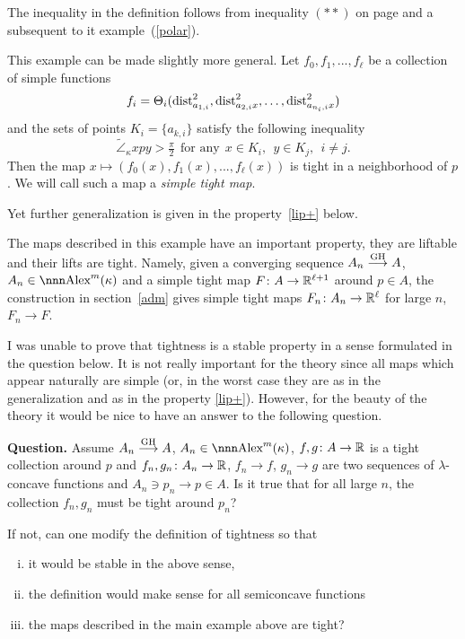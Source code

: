 \documentclass{article}
\begin{document}
The inequality in the definition follows from inequality $(**)$ 
on page \pageref{**-polar-inq} and a subsequent to it example~(\ref{polar}).

This example can be made slightly more general.
Let $f_0,f_1,...,f_\ell$ be a collection of simple functions
$$f_i=\Theta_i(\operatorname{dist}_{a_{1,i}}^2,\operatorname{dist}_{a_{2,i}x}^2,\dots, \operatorname{dist}_{a_{n_i,i}x}^2)$$
and the sets of points $K_i=\{a_{k,i}\}$ satisfy the following inequality
$$\tilde\angle_\kappa x p y>\tfrac\pi2\ \ \text{for any}\ \  x\in K_i,\ \  y\in K_j,\ \ i\not=j.$$
Then the map
$x\mapsto(f_0(x),f_1(x),...,f_\ell(x))$
is tight in a neighborhood of $p$.
 We will call such a map a \emph{simple tight map}.

Yet further generalization is given in the property~\ref{lip+} below.

The maps described in this example have an important property, they are liftable
and their lifts are tight. 
Namely, given a converging sequence $A_n\GHto A$, $A_n\in\Alex^m(\kappa)$ and a
simple tight map $F\colon A\to \mathbb{R}^{\ell+1}$ around $p\in A$, the construction in
section~\ref{adm} gives simple tight maps $F_n\colon A_n\to \mathbb{R}^\ell$ for large $n$, $F_n\to F$.

I was unable to prove that tightness is a stable property in a sense
formulated in the question below.
It is not really important for the theory since all maps which appear naturally 
are simple (or, in the worst case they are as in the generalization and
as in the property \ref{lip+}).
However, for the beauty of the theory it would be nice to have an answer to
the following question.

\begin{thm}{\bf Question.} Assume $A_n\GHto A$, $A_n\in\Alex^m(\kappa)$,
$f,g\colon A\to \mathbb{R}$ is a tight collection around $p$ and $f_n,g_n\colon A_n\to\mathbb{R}$, $f_n\to
f$, $g_n\to g$ are two sequences of $\lambda$-concave
functions and $A_n\ni p_n\to p\in A$. 
Is it true that for all large $n$, the collection $f_n,g_n$ must be
tight around $p_n$?

If not, can one modify the definition of tightness so that
\begin{enumerate}[(i)]
\item it would be stable in the above sense,
\item the definition would make sense for all semiconcave functions
\item the maps described in the main example above are tight?
\end{enumerate}
\end{thm}
\end{document}
